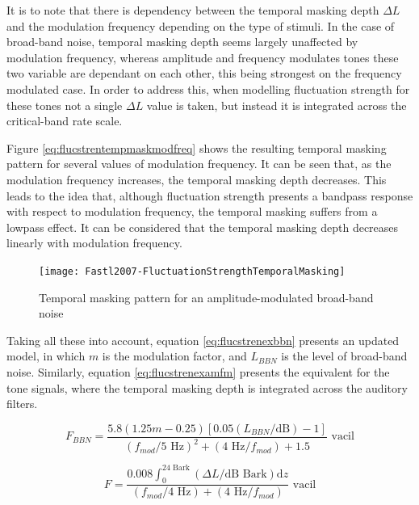 It is to note that there is dependency between the temporal masking depth
$\Delta L$ and the modulation frequency depending on the type of stimuli. In the
case of broad-band noise, temporal masking depth seems largely unaffected by 
modulation frequency, whereas amplitude and frequency modulates tones these two
variable are dependant on each other, this being strongest on the frequency
modulated case. In order to address this, when modelling fluctuation strength
for these tones not a single $\Delta L$ value is taken, but instead it is
integrated across the critical-band rate scale.

Figure \ref{eq:flucstrentempmaskmodfreq} shows the resulting temporal masking
pattern for several values of modulation frequency. It can be seen that, as the
modulation frequency increases, the temporal masking depth decreases. This leads
to the idea that, although fluctuation strength presents a bandpass response
with respect to modulation frequency, the temporal masking suffers from a
lowpass effect. It can be considered that the temporal masking depth decreases
linearly with modulation frequency.

\begin{figure}
    \centering
    \texttt{[image: Fastl2007-FluctuationStrengthTemporalMasking]}
    \caption{Temporal masking pattern for an amplitude-modulated broad-band
        noise \cite[pp. 255]{Fastl2007Psychoacoustics}}
    \label{fig:flucstrenmasking}
\end{figure}

Taking all these into account, equation \ref{eq:flucstrenexbbn} presents an
updated model, in which $m$ is the modulation factor, and $L_{BBN}$ is the level
of broad-band noise. Similarly, equation \ref{eq:flucstrenexamfm} presents the
equivalent for the tone signals, where the temporal masking depth is integrated
across the auditory filters.

\begin{equation}
    F_{BBN} = \frac{5.8(1.25m-0.25)[0.05(L_{BBN}/\text{dB})-1]}
        {(f_{mod}/5\text{ Hz})^2+(4\text{ Hz}/f_{mod})+1.5} \text{ vacil}
    \label{eq:flucstrenexbbn}
\end{equation}

\begin{equation}
    F = \frac{0.008 \int_0^{24\text{ Bark}}(\Delta L/\text{dB Bark})\mathrm{d}z}
        {(f_{mod}/4\text{ Hz})+(4\text{ Hz}/f_{mod})} \text{ vacil}
    \label{eq:flucstrenexamfm}
\end{equation}




